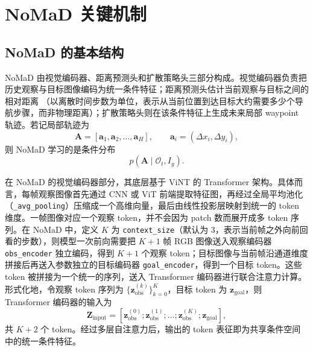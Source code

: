 \section{NoMaD 关键机制}

\subsection{NoMaD 的基本结构}

NoMaD 由视觉编码器、距离预测头和扩散策略头三部分构成\cite{nomad2023}。视觉编码器负责把历史观察与目标图像编码为统一条件特征；距离预测头估计当前观察与目标之间的相对距离
（以离散时间步数为单位，表示从当前位置到达目标大约需要多少个导航步骤，而非物理距离）；扩散策略头则在该条件特征上生成未来局部 waypoint 轨迹。若记局部轨迹为
\begin{equation}
\mathbf{A} = [\mathbf{a}_1,\mathbf{a}_2,\ldots,\mathbf{a}_H], \qquad \mathbf{a}_i=(\Delta x_i,\Delta y_i),
\end{equation}
则 NoMaD 学习的是条件分布
\begin{equation}
p(\mathbf{A}\mid \mathcal{O}_t, I_g).
\end{equation}

在 NoMaD 的视觉编码器部分，其底层基于 ViNT 的 Transformer 架构。具体而言，每帧观察图像首先通过 CNN 或 ViT 前端提取特征图，再经过全局平均池化（\texttt{\_avg\_pooling}）压缩成一个高维向量，最后由线性投影层映射到统一的 token 维度。一帧图像对应一个观察 token，并不会因为 patch 数而展开成多 token 序列。在 NoMaD 中，定义 $K$ 为 \texttt{context\_size}（默认为 3，表示当前帧之外向前回看的步数），则模型一次前向需要把 $K+1$ 帧 RGB 图像送入观察编码器 \texttt{obs\_encoder} 独立编码，得到 $K+1$ 个观察 token；目标图像与当前帧沿通道维度拼接后再送入参数独立的目标编码器 \texttt{goal\_encoder}，得到一个目标 token。这些 token 被拼接为一个统一的序列，送入 Transformer 编码器进行联合注意力计算。形式化地，令观察 token 序列为 $\{\mathbf{z}_{\text{obs}}^{(k)}\}_{k=0}^{K}$，目标 token 为 $\mathbf{z}_{\text{goal}}$，则 Transformer 编码器的输入为
\begin{equation}
\mathbf{Z}_{\text{input}} = [\mathbf{z}_{\text{obs}}^{(0)}; \mathbf{z}_{\text{obs}}^{(1)}; \ldots; \mathbf{z}_{\text{obs}}^{(K)}; \mathbf{z}_{\text{goal}}],
\end{equation}
共 $K+2$ 个 token。经过多层自注意力后，输出的 token 表征即为共享条件空间中的统一条件特征。

